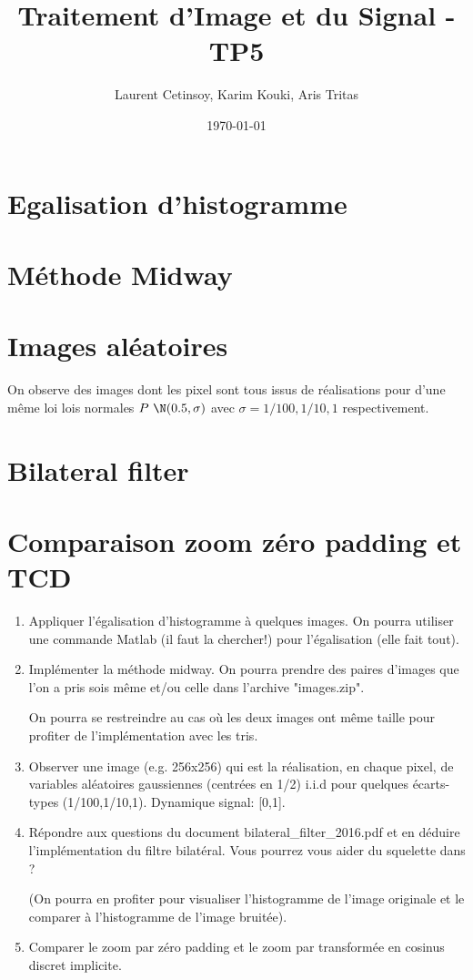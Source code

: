 \documentclass{article}
\title{Traitement d'Image et du Signal - TP5}
\author{Laurent Cetinsoy, Karim Kouki, Aris Tritas }
\date{\today}
\begin{document}
\maketitle

\section{Egalisation d'histogramme}

\section{Méthode Midway}

\section{Images aléatoires}

On observe des images dont les pixel sont tous issus de réalisations  pour d'une même loi lois normales $P ~ \N(0.5, \sigma)$ avec $\sigma = 1/100, 1/10, 1$ respectivement. 




\section{Bilateral filter}


\section{Comparaison zoom zéro padding et TCD}

\begin{enumerate}
\item Appliquer l'égalisation d'histogramme à quelques images. On pourra
utiliser une commande Matlab (il faut la chercher!) pour l'égalisation
(elle fait tout).
\item Implémenter la méthode midway. On pourra prendre des paires d'images
que l'on a pris sois même et/ou celle dans l'archive "images.zip".

On pourra se restreindre au cas où les deux images ont même taille pour
profiter de l'implémentation avec les tris.

\item  Observer une image (e.g. 256x256) qui est la réalisation, en chaque
pixel, de variables aléatoires gaussiennes (centrées en 1/2) i.i.d pour
quelques écarts-types (1/100,1/10,1). Dynamique signal: [0,1].

\item Répondre aux questions du document bilateral\_filter\_2016.pdf et en
déduire l'implémentation du filtre bilatéral. Vous pourrez vous aider du
squelette dans ?

(On pourra en profiter pour visualiser l'histogramme de l'image
originale et le comparer à l'histogramme de l'image bruitée).

\item Comparer le zoom par zéro padding et le zoom par transformée en
cosinus discret implicite.
\end{enumerate}
\end{document}
